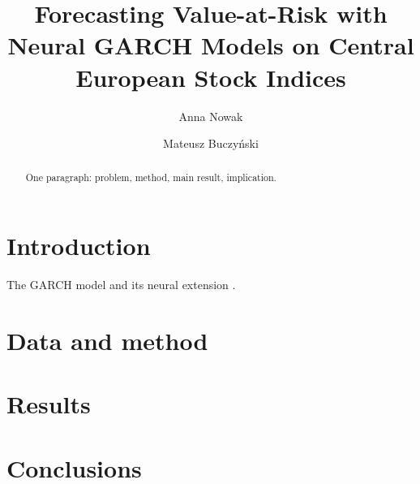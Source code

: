 \documentclass[11pt,a4paper]{article}
\title{Forecasting Value-at-Risk with Neural GARCH Models on Central European Stock Indices}
\author{Anna Nowak \and Mateusz Buczy\'nski}
\date{}
\begin{document}
\maketitle
\ifdefined\thesisbuild\thispagestyle{empty}\fi

\begin{abstract}
One paragraph: problem, method, main result, implication.
\end{abstract}

\section{Introduction}
The GARCH model \citep{bollerslev1986} and its neural extension \citep{buczynski2024garchnet}.

\section{Data and method}
\section{Results}
\section{Conclusions}


\end{document}
